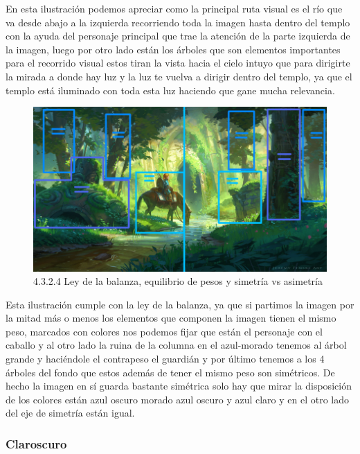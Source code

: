 \documentclass[12pt]{article}
\begin{document}
 En esta ilustración podemos apreciar como la principal ruta visual es el río que va desde abajo a la izquierda recorriendo toda la imagen hasta dentro del templo con la ayuda del personaje principal que trae la atención de la parte izquierda de la imagen, luego por otro lado están los árboles que son elementos importantes para el recorrido visual estos tiran la vista hacia el cielo intuyo que para dirigirte la mirada a donde hay luz y la luz te vuelva a dirigir dentro del templo, ya que el templo está iluminado con toda esta luz haciendo que gane mucha relevancia.

    \begin{figure}[H]
      \centering
      \includegraphics[scale=0.7]{images/Saúl/Sección 3/EA_img3_2Composicion_4LeyBalanza-Simetria.png}
      \caption{\small 4.3.2.4 Ley de la balanza, equilibrio de pesos y simetría vs asimetría}
    \end{figure}

Esta ilustración cumple con la ley de la balanza, ya que si partimos la imagen por la mitad más o menos los elementos que componen la imagen tienen el mismo peso, marcados con colores nos podemos fijar que están el personaje con el caballo y al otro lado la ruina de la columna en el azul-morado tenemos al árbol grande y haciéndole el contrapeso el guardián y por último tenemos a los 4 árboles del fondo que estos además de tener el mismo peso son simétricos. De hecho la imagen en sí guarda bastante simétrica solo hay que mirar la disposición de los colores están azul oscuro morado azul oscuro y azul claro y en el otro lado del eje de simetría están igual.



        \subsubsection{Claroscuro}
\end{document}
